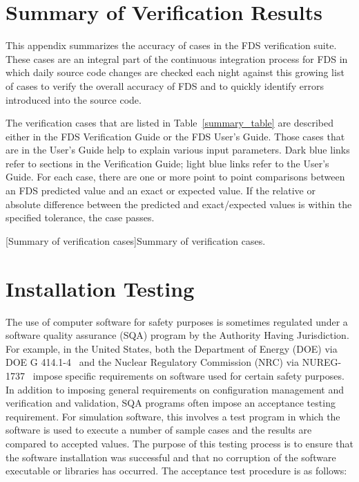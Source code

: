 \documentclass[11pt]{book}
\begin{document}
\printbibliography[heading=bibintoc,title={References}]


\appendix

\chapter{Summary of Verification Results}
\label{info:verification_statistics}

This appendix summarizes the accuracy of cases in the FDS verification suite. These cases are an integral part of the continuous integration process for FDS in which daily source code changes are checked each night against this growing list of cases to verify the overall accuracy of FDS and to quickly identify errors introduced into the source code.

The verification cases that are listed in Table~\ref{summary_table} are described either in the FDS Verification Guide or the FDS User's Guide. Those cases that are in the User's Guide help to explain various input parameters. Dark blue links refer to sections in the Verification Guide; light blue links refer to the User's Guide. For each case, there are one or more point to point comparisons between an FDS predicted value and an exact or expected value. If the relative or absolute difference between the predicted and exact/expected values is within the specified tolerance, the case passes.

\begin{landscape}
[Summary of verification cases]{Summary of verification cases.} \label{summary_table}
\end{landscape}



\chapter{Installation Testing}
\label{info:installation_testing}

The use of computer software for safety purposes is sometimes regulated under a software quality assurance (SQA) program by the Authority Having Jurisdiction.  For example, in the United States, both the Department of Energy (DOE) via DOE G 414.1-4~\cite{DOE_G_414} and the Nuclear Regulatory Commission (NRC) via NUREG-1737~\cite{NUREG_1737} impose specific requirements on software used for certain safety purposes.  In addition to imposing general requirements on configuration management and verification and validation, SQA programs often impose an acceptance testing requirement.  For simulation software, this involves a test program in which the software is used to execute a number of sample cases and the results are compared to accepted values.  The purpose of this testing process is to ensure that the software installation was successful and that no corruption of the software executable or libraries has occurred. The acceptance test procedure is as follows:
\end{document}

